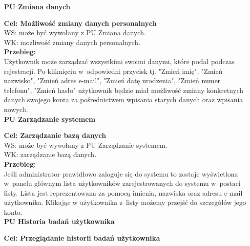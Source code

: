 \documentclass[12pt, letterpaper]{article}
\begin{document}
		\newpage		
		
		\textbf{PU Zmiana danych}
		
		\quad
		
		\textbf{Cel: Możliwość zmiany danych personalnych}\\
		
		WS: może być wywołany z PU Zmiana danych.\\
		
		WK: możliwość zmiany danych personalnych.\\
		
		\textbf{Przebieg:}\\
		Użytkownik może zarządzać wszystkimi swoimi danymi, które podał podczas rejestracji. Po kliknięciu w~odpowiedni przycisk tj. "Zmień imię", "Zmień nazwisko", "Zmień adres e-mail", "Zmień datę urodzenia", "Zmień numer telefonu", "Zmień hasło" użytkownik będzie miał możliwość zmiany konkretnych danych swojego konta za pośrednictwem wpisania starych danych oraz wpisania nowych.
		 \\
			
		
		
		\textbf{PU Zarządzanie systemem}
		
		\quad
		
		\textbf{Cel: Zarządzanie bazą danych}\\
		
		WS: może być wywołany z PU Zarządzanie systemem.\\
		
		WK: zarządzanie bazą danych. \\
		
		\textbf{Przebieg:}\\
		Jeśli administrator prawidłowo zaloguje się do systemu to zostaje wyświetlona w~panelu głównym lista użytkowników zarejestrowanych do systemu w~postaci listy. Lista jest reprezentowana za pomocą imienia, nazwiska oraz adresu e-mail użytkownika. Klikając w użytkownika z~listy możemy przejść do szczegółów jego konta.\\	
		
		
		\textbf{PU Historia badań użytkownika}
		
		\quad
		
		\textbf{Cel: Przeglądanie historii badań użytkownika}\\
		
\end{document}
